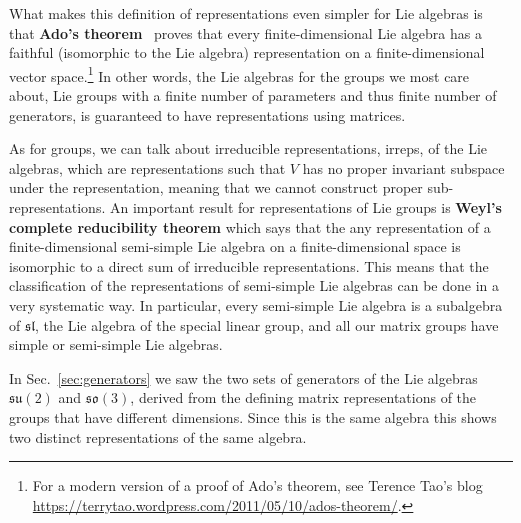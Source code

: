 \documentclass[notes.tex]{subfiles}
\begin{document}
What makes this definition of representations even simpler for Lie algebras is that {\bf Ado's theorem}~\cite{Ado:1935} proves that every finite-dimensional Lie algebra has a faithful (isomorphic to the Lie algebra) representation on a finite-dimensional vector space.\footnote{For a modern version of a proof of Ado's theorem, see Terence Tao's blog \url{https://terrytao.wordpress.com/2011/05/10/ados-theorem/}.} In other words, the Lie algebras for the groups we most care about, Lie groups with a finite number of parameters and thus finite number of generators, is guaranteed to have representations using matrices.

As for groups, we can talk about irreducible representations, irreps, of the Lie algebras, which are representations such that $V$ has no proper invariant subspace under the representation, meaning that we cannot construct proper sub-representations.
An important result for representations of Lie groups is {\bf Weyl's complete reducibility theorem} which says that the any representation of a finite-dimensional semi-simple Lie algebra  on a finite-dimensional space is isomorphic to a direct sum of irreducible representations. This means that the classification of the representations of semi-simple Lie algebras can be done in a very systematic way. In particular, every semi-simple Lie algebra is a subalgebra of $\mathfrak {sl}$, the Lie algebra of the special linear group, and all our matrix groups have simple or semi-simple Lie algebras.

In Sec.~\ref{sec:generators} we saw the two sets of generators of the Lie algebras $\mathfrak{su(2)}$ and $\mathfrak{so(3)}$, derived from the defining matrix representations of the groups that have different dimensions. Since this is the same algebra this shows two distinct representations of the same algebra. 


\end{document}
